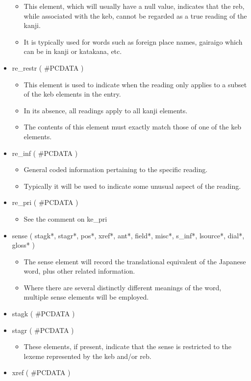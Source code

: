 \documentclass[11pt]{article}
\begin{document}
\begin{itemize}
\begin{itemize}
\item This element, which will usually have a null value, indicates that the reb, while associated with the keb, cannot be regarded as a true reading of the kanji.
\item It is typically used for words such as foreign place names, gairaigo which can be in kanji or katakana, etc.
\end{itemize}
\item re\_restr ( \#PCDATA )
\begin{itemize}
\item This element is used to indicate when the reading only applies to a subset of the keb elements in the entry.
\item In its absence, all readings apply to all kanji elements.
\item The contents of this element must exactly match those of one of the keb elements.
\end{itemize}
\item re\_inf ( \#PCDATA )
\begin{itemize}
\item General coded information pertaining to the specific reading.
\item Typically it will be used to indicate some unusual aspect of the reading.
\end{itemize}
\item re\_pri ( \#PCDATA )
\begin{itemize}
\item See the comment on ke\_pri
\end{itemize}
\item sense ( stagk*, stagr*, pos*, xref*, ant*, field*, misc*, s\_inf*, lsource*, dial*, gloss* )
\begin{itemize}
\item The sense element will record the translational equivalent of the Japanese word, plus other related information.
\item Where there are several distinctly different meanings of the word, multiple sense elements will be employed.
\end{itemize}
\item stagk ( \#PCDATA )
\item stagr ( \#PCDATA )
\begin{itemize}
\item These elements, if present, indicate that the sense is restricted to the lexeme represented by the keb and/or reb.
\end{itemize}
\item xref ( \#PCDATA )

\end{itemize}
\end{document}
